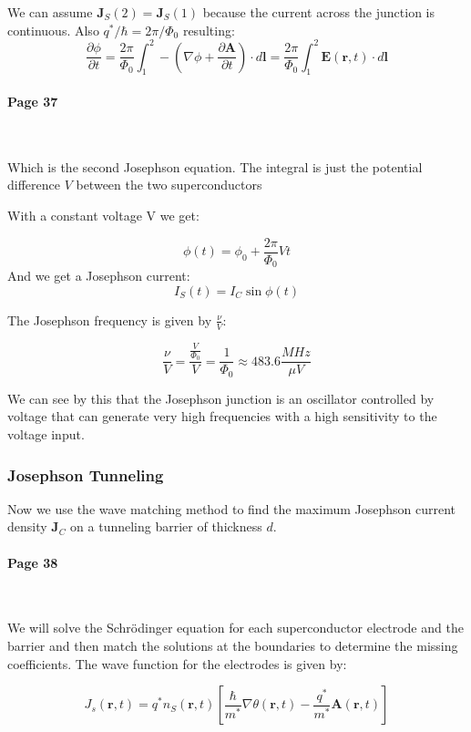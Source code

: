 \documentclass[12pt]{article}
\numberwithin{equation}{subsection}
\newcommand\page[1]{
{
\color{blue}\paragraph{
Page #1
}\mbox{}\\
}
}
\begin{document}
We can assume $\mathbf J_S(2)= \mathbf J_S(1)$ because the current across the junction is continuous. Also $q^*/\hbar = 2\pi/\Phi_0$ resulting:
\begin{equation}
    \frac{\partial \phi}{\partial t} = \frac{2\pi}{\Phi_0} \int_1^2 -\left (\nabla \phi+ \frac{\partial\mathbf A}{\partial t} \right) \cdot d \mathbf l=  \frac{2\pi}{\Phi_0} \int_1^2 \mathbf E (\mathbf r, t) \cdot d \mathbf l
\label{eq:phase-efield}
\end{equation}
\page{37}
Which is the second Josephson equation. The integral is just the potential difference $V$ between the two superconductors 

With a constant voltage V we get:

\begin{equation}
    \phi(t) = \phi_0 +\frac{2\pi}{\Phi_0}V t
    \label{eq:cst-voltage}
\end{equation}
And we get a Josephson current:
\begin{equation}
    I_S(t) = I_C\sin\phi(t)
    \label{eq:josephson-current}
\end{equation}

The Josephson frequency is given by $\frac{\nu}{V}$:

\begin{equation}
    \frac{\nu}{V} = \frac{\frac{V}{\Phi_0}}{V}= \frac{1}{\Phi_0} \approx 483.6\frac{MHz}{\mu V}
\end{equation}

We can see by this that the Josephson junction is an oscillator controlled by voltage that can generate very high frequencies with a high sensitivity to the voltage input.

\subsubsection{Josephson Tunneling}
Now we use the wave matching method to find the maximum Josephson current density $\mathbf J_C$ on a tunneling barrier of thickness $d$.
\page{38}
We will solve the Schrödinger equation for each superconductor electrode and the barrier and then match the solutions at the boundaries to determine the missing coefficients.
The wave function for the electrodes is given by:

\begin{equation}
    J_s(\mathbf r, t) = q^*n_S(\mathbf r, t) \left [ \frac{\hbar}{m^*}\nabla\theta(\mathbf r, t) - \frac{q^*}{m^*}\mathbf A (\mathbf r, t)  \right] 
\end{equation}
\end{document}
